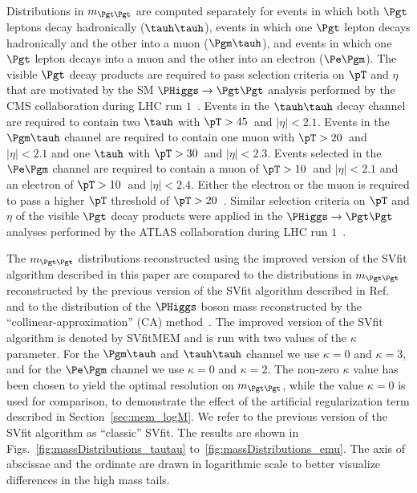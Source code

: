 Distributions in $m_{\Pgt\Pgt}$ are computed separately for events in which 
both $\Pgt$ leptons decay hadronically ($\tauh\tauh$), 
events in which one $\Pgt$ lepton decays hadronically and the other into a muon ($\Pgm\tauh$),
and events in which one $\Pgt$ lepton decays into a muon and the other into an electron ($\Pe\Pgm$).
The visible $\Pgt$ decay products are required to pass selection criteria on $\pT$ and $\eta$ 
that are motivated by the SM $\PHiggs \to \Pgt\Pgt$ analysis performed by the CMS collaboration during LHC run $1$~\cite{HIG-13-004}.
Events in the $\tauh\tauh$ decay channel are required to contain
two $\tauh$ with $\pT > 45$~\GeV and $\vert\eta\vert < 2.1$.
Events in the $\Pgm\tauh$ channel
are required to contain one muon with $\pT > 20$~\GeV and $\vert\eta\vert < 2.1$ and one $\tauh$ with $\pT > 30$~\GeV and $\vert\eta\vert < 2.3$.
Events selected in the $\Pe\Pgm$ channel are required to contain a muon of $\pT > 10$~\GeV and $\vert\eta\vert < 2.1$ and an electron of $\pT > 10$~\GeV and $\vert\eta\vert < 2.4$.
Either the electron or the muon is required to pass a higher $\pT$ threshold of $\pT > 20$~\GeV.
Similar selection criteria on $\pT$ and $\eta$ of the visible $\Pgt$ decay products were applied in the $\PHiggs \to \Pgt\Pgt$
analyses performed by the ATLAS
collaboration during LHC run $1$~\cite{ATLAS_HiggsTauTau_SM,ATLAS_HiggsTauTau_MSSM}.

The $m_{\Pgt\Pgt}$ distributions reconstructed using the 
improved version of the SVfit algorithm described in this paper
are compared to the distributions in $m_{\Pgt\Pgt}$ reconstructed by the previous version of the
SVfit algorithm described in Ref.~\cite{SVfit} and to the distribution of the $\PHiggs$ boson
mass reconstructed by the ``collinear-approximation'' (CA)
method~\cite{massRecoCollinearApprox}.
The improved version of the SVfit algorithm is denoted by SVfitMEM 
and is run with two values of the $\kappa$ parameter.
For the $\Pgm\tauh$ and $\tauh\tauh$ channel we use $\kappa = 0$ and $\kappa = 3$,
and for the $\Pe\Pgm$ channel we use $\kappa = 0$ and $\kappa = 2$.
The non-zero $\kappa$ value has been chosen to yield the optimal resolution on $m_{\Pgt\Pgt}$,
while the value $\kappa = 0$ is used for comparison, to demonstrate the effect of the artificial regularization term described in Section~\ref{sec:mem_logM}.
We refer to the previous version of the SVfit algorithm as ``classic'' SVfit.
The results are shown in Figs.~\ref{fig:massDistributions_tautau} to~\ref{fig:massDistributions_emu}.
The axis of abscissae and the ordinate are drawn in logarithmic scale to better visualize differences in the high mass tails.


